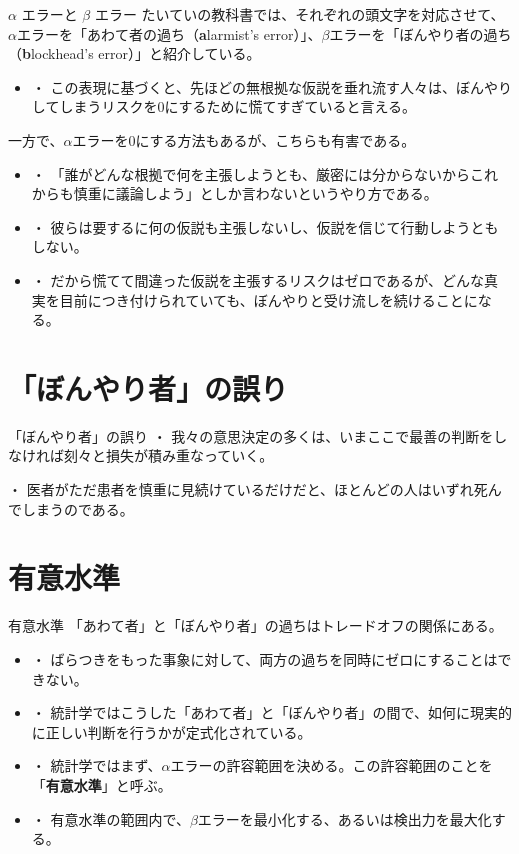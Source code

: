 \documentclass[dvipdfmx, autodetect-engine, aspectratio=169, 10.5pt]{beamer}
\begin{document}
\begin{frame}{$\alpha$ エラーと $\beta$ エラー}
	たいていの教科書では、それぞれの頭文字を対応させて、$\alpha$エラーを「あわて者の過ち（\textbf{a}larmist's error）」、$\beta$エラーを「ぼんやり者の過ち（\textbf{b}lockhead's error）」と紹介している。
	\begin{itemize}
		\item ・ この表現に基づくと、先ほどの無根拠な仮説を垂れ流す人々は、ぼんやりしてしまうリスクを0にするために慌てすぎていると言える。
	\end{itemize}
	一方で、$\alpha$エラーを0にする方法もあるが、こちらも有害である。
	\begin{itemize}
		\item ・ 「誰がどんな根拠で何を主張しようとも、厳密には分からないからこれからも慎重に議論しよう」としか言わないというやり方である。
		\item ・ 彼らは要するに何の仮説も主張しないし、仮説を信じて行動しようともしない。
		\item ・ だから慌てて間違った仮説を主張するリスクはゼロであるが、どんな真実を目前につき付けられていても、ぼんやりと受け流しを続けることになる。
	\end{itemize}
\end{frame}

\section{「ぼんやり者」の誤り}

\begin{frame}{「ぼんやり者」の誤り}
	・ 我々の意思決定の多くは、いまここで最善の判断をしなければ刻々と損失が積み重なっていく。

	\vspace{7mm}

	・ 医者がただ患者を慎重に見続けているだけだと、ほとんどの人はいずれ死んでしまうのである。
\end{frame}

\section{有意水準}

\begin{frame}{有意水準}
	「あわて者」と「ぼんやり者」の過ちはトレードオフの関係にある。
	\begin{itemize}
		\item ・ ばらつきをもった事象に対して、両方の過ちを同時にゼロにすることはできない。
		      \vspace{5mm}
		\item ・ 統計学ではこうした「あわて者」と「ぼんやり者」の間で、如何に現実的に正しい判断を行うかが定式化されている。
		      \vspace{5mm}
		\item ・ 統計学ではまず、$\alpha$エラーの許容範囲を決める。この許容範囲のことを「\textbf{有意水準}」と呼ぶ。
		\item ・ 有意水準の範囲内で、$\beta$エラーを最小化する、あるいは検出力を最大化する。
	\end{itemize}
\end{frame}
\end{document}
